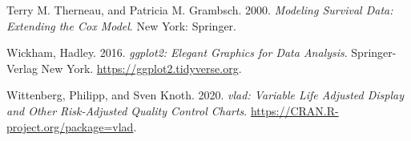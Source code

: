 \begin{CSLReferences}{1}{0}
\leavevmode{}%
Terry M. Therneau, and Patricia M. Grambsch. 2000. \emph{Modeling Survival Data: Extending the {C}ox Model}. New York: Springer.

\leavevmode{}%
Wickham, Hadley. 2016. \emph{{ggplot2}: Elegant Graphics for Data Analysis}. Springer-Verlag New York. \url{https://ggplot2.tidyverse.org}.

\leavevmode{}%
Wittenberg, Philipp, and Sven Knoth. 2020. \emph{{vlad}: Variable Life Adjusted Display and Other Risk-Adjusted Quality Control Charts}. \url{https://CRAN.R-project.org/package=vlad}.

\end{CSLReferences}


\address{%
Daniel Gomon\\
Leiden University\\%
Mathematical Institute\\ Niels Bohrweg 1\\ 2333CA Leiden, the Netherlands\\
%
\url{https://github.com/d-gomon}\\%
\textit{ORCiD: \href{https://orcid.org/0000-0001-9011-3743}{0000-0001-9011-3743}}\\%
\href{mailto:d.gomon@math.leidenuniv.nl}{\nolinkurl{d.gomon@math.leidenuniv.nl}}%
}

\address{%
Marta Fiocco\\
Leiden University\\%
Mathematical Institute\\ Niels Bohrweg 1\\ 2333CA Leiden, the Netherlands\\
%
%
\textit{ORCiD: \href{https://orcid.org/0000-0001-5588-0277}{0000-0001-5588-0277}}\\%
%
}

\address{%
Hein Putter\\
Leiden University\\%
Mathematical Institute\\ Niels Bohrweg 1\\ 2333CA Leiden, the Netherlands\\
%
%
\textit{ORCiD: \href{https://orcid.org/0000-0001-5395-1422}{0000-0001-5395-1422}}\\%
%
}

\address{%
Mirko Signorelli\\
Leiden University\\%
Mathematical Institute\\ Niels Bohrweg 1\\ 2333CA Leiden, the Netherlands\\
%
%
\textit{ORCiD: \href{https://orcid.org/0000-0002-8102-3356}{0000-0002-8102-3356}}\\%
%
}
